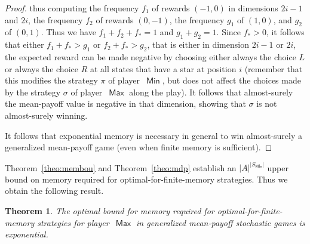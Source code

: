 \documentclass{article}
\newtheorem{theorem}{Theorem}
\def\abs#1{\ensuremath{\lvert #1\rvert}}
\newcommand{\straa}{\sigma}
\newcommand{\strab}{\pi}
\DeclareMathOperator{\ma}{\mathsf{Max}}
\DeclareMathOperator{\mi}{\mathsf{Min}}
\begin{document}
\begin{proof}
thus computing the frequency $f_1$ of rewards $(-1,0)$
in dimensions $2i-1$ and $2i$, the frequency $f_2$ of rewards $(0,-1)$, 
the frequency $g_1$ of $(1,0)$, and $g_2$ of $(0,1)$. 
Thus we have $f_1 + f_2 + f_* = 1$ and $g_1 + g_2 = 1$. Since $f_* > 0$,
it follows that either $f_1 + f_* > g_1$ or $f_2 + f_* > g_2$, that is
either in dimension $2i -1$ or $2i$, the expected reward can be made negative 
by choosing either always the choice $L$ or always the choice $R$ at all states that have 
a star at position $i$ (remember that this modifies the strategy $\strab$ of player~$\mi$, 
but does not affect the choices made by the strategy $\straa$ of player~$\ma$ along
the play). It follows that almost-surely the mean-payoff value 
is negative in that dimension, showing that $\straa$ is not almost-surely winning.

It follows that exponential memory is necessary in general to win almost-surely 
a generalized mean-payoff game (even when finite memory is sufficient).
\end{proof}

\smallskip{} 
Theorem~\ref{theo:membou} and Theorem~\ref{theo:mdp} establish an $\abs{A}^{\abs{S_{\mi}}}$ 
upper bound on memory required for optimal-for-finite-memory strategies. 
Thus we obtain the following result.

\begin{theorem}\label{theo:memgenmean}
The optimal bound for memory required for optimal-for-finite-memory strategies for 
player~$\ma$ in generalized mean-payoff stochastic games is exponential.
\end{theorem}



\begin{comment}
\smallskip\noindent{\em Lower bound dependent on weights.}
The family of examples in Lemma~\ref{lem:exponential} has unbounded number of states,
and unbounded dimension of the reward function. However, the rewards are bounded 
(in $\{-1,0,1\}$). There exist games where the memory needed to win almost-surely
is exponential, but the number of states and the dimension are fixed. Thus the
memory depends exponentially only on the numbers in the reward function: in the
example of \figurename~\ref{fig:exponential-numbers}, player~$\ma$ needs to stay
$W$ times in $t_2$ (resp., $t_3$) if previously player~$\mi$ visited $s_2$ (resp., $s_3$),
which requires exponential memory (as the number $W$ is encoded in binary).


\smallskip\noindent{\bf Open question.}
The question whether exponential memory is sufficient for optimal-for-finite-memory 
strategies remains open.
Currently we do not have any explicit upper bound. 
\end{comment}
\end{document}
